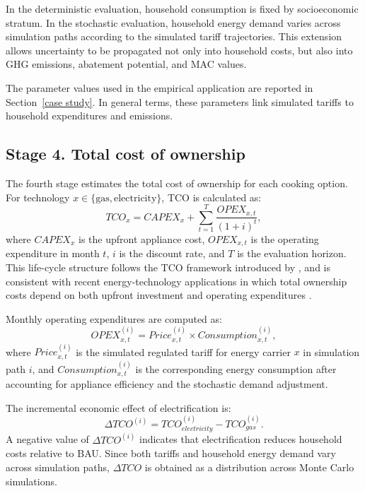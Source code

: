 \documentclass[authoryear,preprint,review,10pt]{elsarticle}
\begin{document}
In the deterministic evaluation, household consumption is fixed by socioeconomic stratum. In the stochastic evaluation, household energy demand varies across simulation paths according to the simulated tariff trajectories. This extension allows uncertainty to be propagated not only into household costs, but also into GHG emissions, abatement potential, and MAC values.

The parameter values used in the empirical application are reported in Section~\ref{case study}. In general terms, these parameters link simulated tariffs to household expenditures and emissions.

\subsection{Stage 4. Total cost of ownership}
\label{sec:cost_calculation}

The fourth stage estimates the total cost of ownership for each cooking option. For technology $x \in \{\text{gas},\text{electricity}\}$, TCO is calculated as:
\begin{equation}
TCO_x = CAPEX_x + \sum_{t=1}^{T} \frac{OPEX_{x,t}}{(1+i)^t},
\end{equation}
where $CAPEX_x$ is the upfront appliance cost, $OPEX_{x,t}$ is the operating expenditure in month $t$, $i$ is the discount rate, and $T$ is the evaluation horizon. This life-cycle structure follows the TCO framework introduced by \citet{ellram1994taxonomy}, and is consistent with recent energy-technology applications in which total ownership costs depend on both upfront investment and operating expenditures \citep{bauer2025total,ElectricVehicleTCO}.

Monthly operating expenditures are computed as:
\begin{equation}
OPEX_{x,t}^{(i)} = Price_{x,t}^{(i)} \times Consumption_{x,t}^{(i)},
\end{equation}
where $Price_{x,t}^{(i)}$ is the simulated regulated tariff for energy carrier $x$ in simulation path $i$, and $Consumption_{x,t}^{(i)}$ is the corresponding energy consumption after accounting for appliance efficiency and the stochastic demand adjustment.

The incremental economic effect of electrification is:
\begin{equation}
\Delta TCO^{(i)} = TCO_{electricity}^{(i)} - TCO_{gas}^{(i)}.
\end{equation}
A negative value of $\Delta TCO^{(i)}$ indicates that electrification reduces household costs relative to BAU. Since both tariffs and household energy demand vary across simulation paths, $\Delta TCO$ is obtained as a distribution across Monte Carlo simulations.
\end{document}
